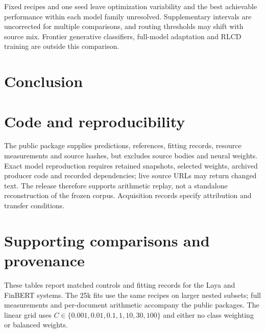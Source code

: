 \documentclass[11pt,a4paper]{article}
\begin{document}
Fixed recipes and one seed leave optimization variability and the best achievable
performance within each model family unresolved. Supplementary intervals are
uncorrected for multiple comparisons, and routing thresholds may shift with
source mix. Frontier generative classifiers, full-model adaptation and RLCD
training are outside this comparison.

\section{Conclusion}


\section*{Code and reproducibility}
The public package supplies predictions, references, fitting records, resource
measurements and source hashes, but excludes source bodies and neural weights.
Exact model reproduction requires retained snapshots, selected weights, archived
producer code and recorded dependencies; live source URLs may return changed text.
The release therefore supports arithmetic replay, not a standalone reconstruction
of the frozen corpus. Acquisition records specify attribution and transfer conditions.


\FloatBarrier

\clearpage
\appendix
\section{Supporting comparisons and provenance}
\label{sec:supporting}
These tables report matched controls and fitting records for the Laya and FinBERT
systems. The 25k fits use the same recipes on larger nested subsets; full
measurements and per-document arithmetic accompany the public packages.
The linear grid uses $C\in\{0.001,\allowbreak0.01,\allowbreak0.1,\allowbreak1,\allowbreak10,\allowbreak30,\allowbreak100\}$
and either no class weighting or balanced weights.

\end{document}
